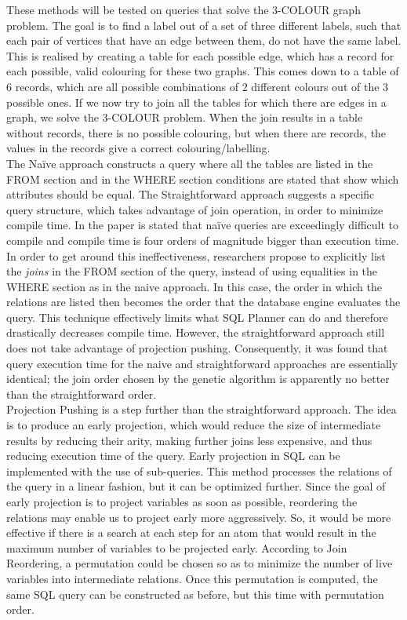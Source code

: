 These methods will be tested on queries that solve the 3-COLOUR graph problem. The goal is to find a label out of a set of three different labels, such that each pair of vertices that have an edge between them, do not have the same label. This is realised by creating a table for each possible edge, which has a record for each possible, valid colouring for these two graphs. This comes down to a table of 6 records, which are all possible combinations of 2 different colours out of the 3 possible ones. If we now try to join all the tables for which there are edges in a graph, we solve the 3-COLOUR problem. When the join results in a table without records, there is no possible colouring, but when there are records, the values in the records give a correct colouring/labelling. \\

The Na\"ive approach constructs a query where all the tables are listed in the FROM section and in the WHERE section conditions are stated that show which attributes should be equal. The Straightforward approach suggests a specific query structure, which takes advantage of join operation, in order to minimize compile time. In the paper is stated that na\"ive queries are exceedingly difficult to compile and compile time is four orders of magnitude bigger than execution time. In order to get around this ineffectiveness, researchers propose to explicitly list the \textit{joins} in the FROM section of the query, instead of using equalities in the WHERE section as in the naive approach. In this case, the order in which the relations are listed then becomes the order that the database engine evaluates the query. This technique effectively limits what SQL Planner can do and therefore drastically decreases compile time. However, the straightforward approach still does not take advantage of projection pushing. Consequently, it was found that query execution time for the naive and straightforward approaches are essentially identical; the join order chosen by the genetic algorithm is apparently no better than the straightforward order. \\

Projection Pushing is a step further than the straightforward approach. The idea is to produce an early projection, which would reduce the size of intermediate results by reducing their arity, making further joins less expensive, and thus reducing execution time of the query. Early projection in SQL can be implemented with the use of sub-queries. This method processes the relations of the query in a linear fashion, but it can be optimized further. Since the goal of early projection is to project variables as soon as possible, reordering the relations may enable us to project early more aggressively. So, it would be more effective if there is a search at each step for an atom that would result in the maximum number of variables to be projected early. According to Join Reordering, a permutation could be chosen so as to minimize the number of live variables into intermediate relations. Once this permutation is computed, the same SQL query can be constructed as before, but this time with permutation order. \\

